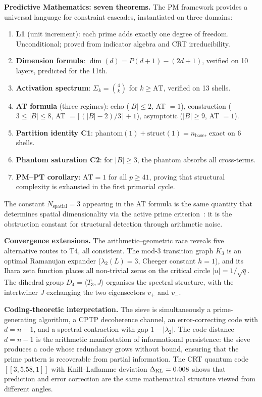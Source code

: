 \documentclass[12pt,a4paper]{article}
\begin{document}
\textbf{Predictive Mathematics: seven theorems.}
The PM framework provides a universal language for constraint cascades,
instantiated on three domains:
\begin{enumerate}[nosep]
\item \textbf{L1} (unit increment): each prime adds exactly one degree of
  freedom.  Unconditional; proved from indicator algebra and CRT irreducibility.
\item \textbf{Dimension formula}: $\dim(d) = P(d{+}1) - (2d{+}1)$, verified
  on 10 layers, predicted for the 11th.
\item \textbf{Activation spectrum}: $\Sigma_k = \binom{4}{k}$ for
  $k \geq \mathrm{AT}$, verified on 13 shells.
\item \textbf{AT formula} (three regimes): echo ($|B| \leq 2$, AT $= 1$),
  construction ($3 \leq |B| \leq 8$,
  AT $= \lceil(|B|-2)/3\rceil + 1$), asymptotic ($|B| \geq 9$, AT $= 1$).
\item \textbf{Partition identity C1}: $\mathrm{phantom}(1) + \mathrm{struct}(1)
  = n_{\mathrm{base}}$, exact on 6 shells.
\item \textbf{Phantom saturation C2}: for $|B| \geq 3$, the phantom absorbs
  all cross-terms.
\item \textbf{PM--PT corollary}: $\mathrm{AT} = 1$ for all $p \geq 41$,
  proving that structural complexity is exhausted in the first primorial
  cycle.
\end{enumerate}
The constant $N_{\mathrm{spatial}} = 3$ appearing in the AT formula is the
same quantity that determines spatial dimensionality via the active prime
criterion~\cite{companion_M2}: it is the obstruction constant for structural
detection through arithmetic noise.

\textbf{Convergence extensions.}
The arithmetic--geometric race reveals five alternative routes to T4, all
consistent.  The mod-3 transition graph $K_3$ is an optimal Ramanujan
expander ($\lambda_2(L) = 3$, Cheeger constant $h = 1$), and its Ihara zeta
function places all non-trivial zeros on the critical circle
$|u| = 1/\sqrt{q}$.  The dihedral group $D_4 = \langle T_3, J \rangle$
organises the spectral structure, with the intertwiner $J$ exchanging the
two eigensectors $v_+$ and $v_-$.

\textbf{Coding-theoretic interpretation.}
The sieve is simultaneously a prime-generating algorithm, a CPTP
decoherence channel, an error-correcting code with $d = n - 1$, and a
spectral contraction with gap $1 - |\lambda_2|$.  The code distance
$d = n - 1$ is the arithmetic manifestation of informational persistence:
the sieve produces a code whose redundancy grows without bound, ensuring
that the prime pattern is recoverable from partial information.  The CRT
quantum code $[[3, 5.58, 1]]$ with Knill--Laflamme deviation
$\Delta_{\rm KL} = 0.008$ shows that prediction and error correction are
the same mathematical structure viewed from different angles.
\end{document}
